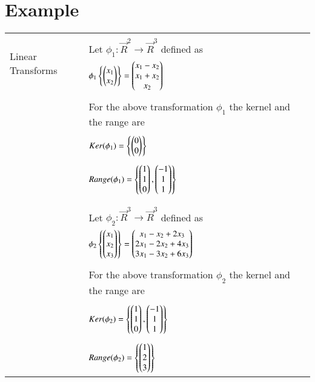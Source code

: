\documentclass[journal,12pt]{IEEEtran}
\begin{document}
	\section{\textbf{Example}}
	\begin{longtable}{|l|l|}
		\hline
		\multirow{3}{*}{Linear Transforms }   
		& \\ 
		& Let $\phi_1 : \vec{R}^{2} \rightarrow \vec{R}^{3}$ defined as \\ Example
		& \qquad \qquad \qquad $\phi_1 \left\{ \begin{pmatrix}x_1 \\ x_2\end{pmatrix}\right\} = \begin{pmatrix}x_1 - x_2 \\ x_1 + x_2 \\ x_2\end{pmatrix}$ \qquad \qquad \\
		& \\
		& For the above transformation $\phi_1$ the kernel and the range are \\
		& \\
		& \qquad \qquad $Ker(\phi_1) = \left\{ \begin{pmatrix}0 \\ 0\end{pmatrix}\right\}$ \\
		& \\
		& \qquad \qquad $Range(\phi_1) = \left\{ \begin{pmatrix}1 \\ 1 \\ 0\end{pmatrix}, \begin{pmatrix}-1 \\ 1 \\ 1\end{pmatrix}\right\}$ \\
		& \\
		& \\
		& Let $\phi_2 : \vec{R}^{3} \rightarrow \vec{R}^{3}$ defined as \\ 
		& \qquad \qquad \qquad $\phi_2 \left\{ \begin{pmatrix}x_1 \\ x_2 \\ x_3\end{pmatrix}\right\} = \begin{pmatrix}x_1 - x_2 + 2x_3 \\ 2x_1 - 2x_2 + 4x_3 \\ 3x_1 - 3x_2 + 6x_3\end{pmatrix}$ \qquad \qquad \\
		& \\
		& For the above transformation $\phi_2$ the kernel and the range are \\
		& \\
		& \qquad \qquad $Ker(\phi_2) = \left\{ \begin{pmatrix}1 \\ 1 \\ 0\end{pmatrix}, \begin{pmatrix}-1 \\ 1 \\ 1\end{pmatrix}\right\}$ \\
		& \\
		& \qquad \qquad $Range(\phi_2) = \left\{\begin{pmatrix}1 \\ 2 \\ 3\end{pmatrix}\right\}$ \\

\end{longtable}
\end{document}
